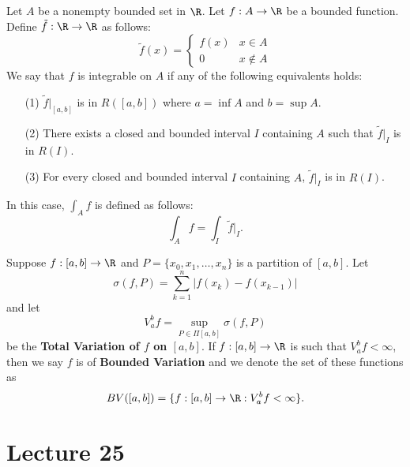 \begin{remark}
    Let \( A  \) be a nonempty bounded set in \( \R  \). Let \( f: A \to \R  \) be a bounded function. Define \( \tilde{f} : \R \to \R  \) as follows: 
    \[  \tilde{f}(x) = 
    \begin{cases}
        f(x) & x \in A  \\
        0 & x \notin A 
    \end{cases} \]
    We say that \( f  \) is integrable on \( A  \) if any of the following equivalents holds: 
    \begin{enumerate}
        \item[(1)] \( \tilde{f} \Big|_{[a,b]} \) is in \( R([a,b]) \) where \( a = \inf A  \) and \( b = \sup A  \).
        \item[(2)] There exists a closed and bounded interval \( I  \) containing \( A  \) such that \( \tilde{f} \Big|_{I} \) is in \( R(I) \).
        \item[(3)] For every closed and bounded interval \( I  \) containing \( A  \), \( \tilde{f} \Big|_{I} \) is in \( R(I) \).
    \end{enumerate}
    In this case, \( \int_{ A  } f   \) is defined as follows:
    \[  \int_{ A  } f  = \int_{ I  } \tilde{f} \Big|_{I}. \tag{where \( I  \) is any closed and bounded interval} \]
\end{remark}

\begin{definition}
    Suppose \( f:[a,b] \to \R  \) and \( P = \{ {x}_{0}, {x}_{1}, \dots, {x}_{n} \}  \) is a partition of \( [a,b] \). Let 
    \[  \sigma(f,P) = \sum_{ k=1  }^{ n } | f({x}_{k}) - f({x}_{k-1}) |  \]
    and let 
    \[  {V}_{a}^{b} f = \sup_{P \in \Pi [a,b]} \sigma(f,P) \]
    be the \textbf{Total Variation of \( f  \) on \( [a,b] \)}. If \( f : [a,b] \to \R  \) is such that \( {V}_{a}^{b} f < \infty   \), then we say \( f  \) is of \textbf{Bounded Variation} and we denote the set of these functions as 
    \[  BV ([a,b]) = \{ f:[a,b] \to \R : {V}_{a}^{b} f < \infty  \}. \]
\end{definition}


\section{Lecture 25}

